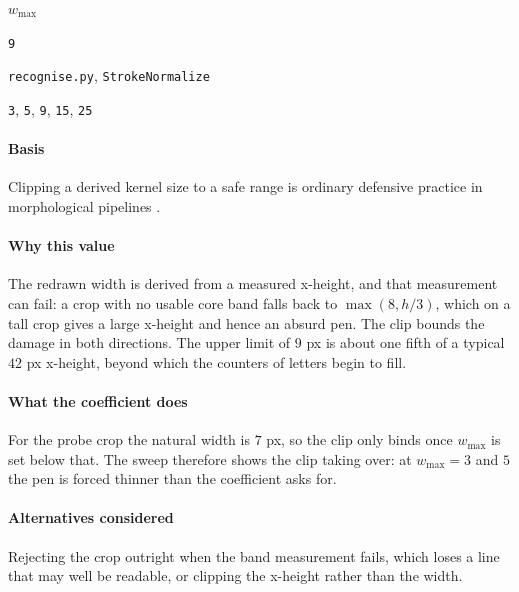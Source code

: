 \begin{description}[leftmargin=5.2em,style=sameline]

\item[Symbol] $w_{\max}$

\item[Value] \texttt{9}

\item[Source] \texttt{recognise.py}, \texttt{StrokeNormalize}

\item[Swept] \texttt{3}, \texttt{5}, \texttt{9}, \texttt{15}, \texttt{25}

\end{description}

\paragraph{Basis}

Clipping a derived kernel size to a safe range is ordinary defensive practice in morphological pipelines \cite{haralick1987}.

\paragraph{Why this value}

The redrawn width is derived from a measured x-height, and that measurement can fail: a crop with no usable core band falls back to $\max(8,h/3)$, which on a tall crop gives a large x-height and hence an absurd pen. The clip bounds the damage in both directions. The upper limit of $9$ px is about one fifth of a typical $42$ px x-height, beyond which the counters of letters begin to fill.

\paragraph{What the coefficient does}

For the probe crop the natural width is $7$ px, so the clip only binds once $w_{\max}$ is set below that. The sweep therefore shows the clip taking over: at $w_{\max} = 3$ and $5$ the pen is forced thinner than the coefficient asks for.

\paragraph{Alternatives considered}

Rejecting the crop outright when the band measurement fails, which loses a line that may well be readable, or clipping the x-height rather than the width.

